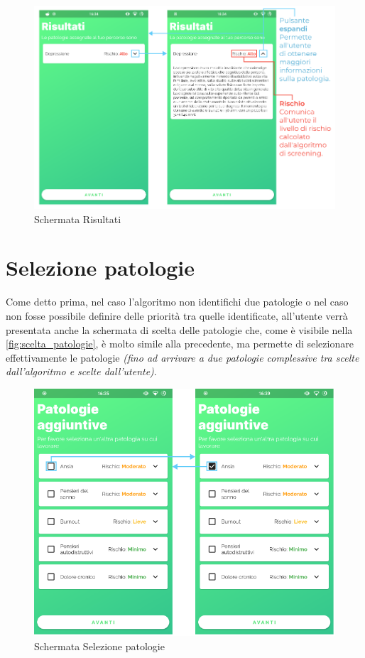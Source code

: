 \begin{figure}[h!]
\centering
\includegraphics[width=\textwidth]{img/risultati}
\caption{Schermata Risultati}
\label{fig:risultati}
\end{figure}

\newpage
\section{Selezione patologie}
Come detto prima, nel caso l'algoritmo non identifichi due patologie o nel caso non fosse possibile definire delle priorità tra quelle identificate, all'utente verrà presentata anche la schermata di scelta delle patologie che, come è visibile nella \autoref{fig:scelta_patologie}, è molto simile alla precedente, ma permette di selezionare effettivamente le patologie \textit{(fino ad arrivare a due patologie complessive tra scelte dall'algoritmo e scelte dall'utente)}.

\begin{figure}[h!]
\centering
\includegraphics[width=\textwidth]{img/scelta_patologie}
\caption{Schermata Selezione patologie}
\label{fig:scelta_patologie}
\end{figure}

